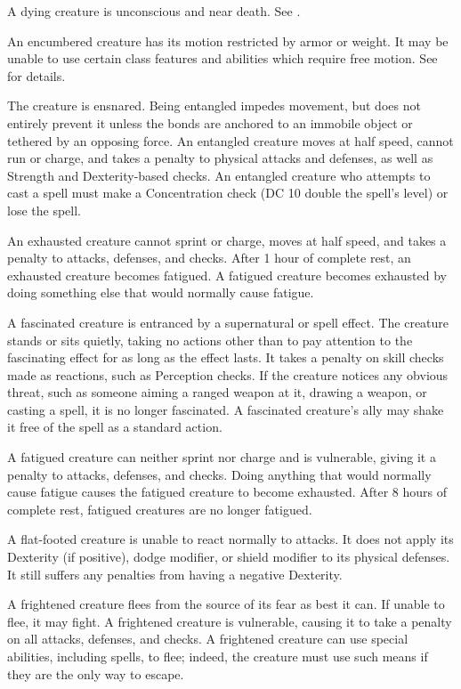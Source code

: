  A dying creature is unconscious and near death. See .

 An encumbered creature has its motion restricted by armor or weight. It may be unable to use certain class features and abilities which require free motion. See  for details.

 The creature is ensnared. Being entangled impedes movement, but does not entirely prevent it unless the bonds are anchored to an immobile object or tethered by an opposing force. An entangled creature moves at half speed, cannot run or charge, and takes a  penalty to physical attacks and defenses, as well as Strength and Dexterity-based checks. An entangled creature who attempts to cast a spell must make a Concentration check (DC 10 \add double the spell's level) or lose the spell.

 An exhausted creature cannot sprint or charge, moves at half speed, and takes a  penalty to attacks, defenses, and checks. After 1 hour of complete rest, an exhausted creature becomes fatigued. A fatigued creature becomes exhausted by doing something else that would normally cause fatigue.

 A fascinated creature is entranced by a supernatural or spell effect. The creature stands or sits quietly, taking no actions other than to pay attention to the fascinating effect for as long as the effect lasts. It takes a  penalty on skill checks made as reactions, such as Perception checks. If the creature notices any obvious threat, such as someone aiming a ranged weapon at it, drawing a weapon, or casting a spell, it is no longer fascinated. A fascinated creature's ally may shake it free of the spell as a standard action.

 A fatigued creature can neither sprint nor charge and is vulnerable, giving it a  penalty to attacks, defenses, and checks. Doing anything that would normally cause fatigue causes the fatigued creature to become exhausted. After 8 hours of complete rest, fatigued creatures are no longer fatigued.

 A flat-footed creature is unable to react normally to attacks. It does not apply its Dexterity (if positive), dodge modifier, or shield modifier to its physical defenses. It still suffers any penalties from having a negative Dexterity.

 A frightened creature flees from the source of its fear as best it can. If unable to flee, it may fight. A frightened creature is vulnerable, causing it to take a  penalty on all attacks, defenses, and checks. A frightened creature can use special abilities, including spells, to flee; indeed, the creature must use such means if they are the only way to escape.

